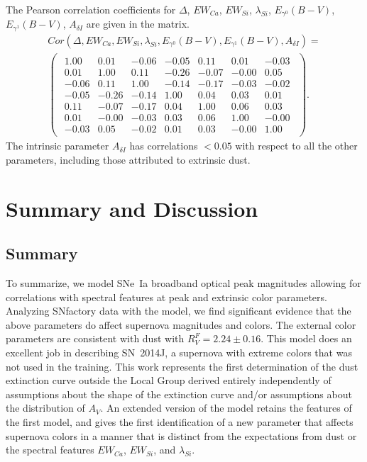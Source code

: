 \documentclass{aastex61}   	%
\begin{document}
The Pearson correlation coefficients for $\Delta$, $EW_{Ca}$, $EW_{Si}$, $\lambda_{Si}$, $E_{\gamma^0}(B-V)$, $E_{\gamma^1}(B-V)$,  $A_{\delta I}$ are given in the matrix.
\begin{multline}
Cor(\Delta, EW_{Ca}, EW_{Si}, \lambda_{Si}, E_{\gamma^0}(B-V), E_{\gamma^1}(B-V),  A_{\delta I}) =\\
\begin{pmatrix}
\begin{array}{rrrrrrr}
1.00 & 0.01 & -0.06 & -0.05 & 0.11 & 0.01 & -0.03 \\
0.01 & 1.00 & 0.11 & -0.26 & -0.07 & -0.00 & 0.05 \\
-0.06 & 0.11 & 1.00 & -0.14 & -0.17 & -0.03 & -0.02 \\
-0.05 & -0.26 & -0.14 & 1.00 & 0.04 & 0.03 & 0.01 \\
0.11 & -0.07 & -0.17 & 0.04 & 1.00 & 0.06 & 0.03 \\
0.01 & -0.00 & -0.03 & 0.03 & 0.06 & 1.00 & -0.00 \\
-0.03 & 0.05 & -0.02 & 0.01 & 0.03 & -0.00 & 1.00
\end{array}
\end{pmatrix}.
\end{multline}
The intrinsic parameter $A_{\delta I}$ has correlations $<0.05$ with respect to all the other parameters, including those attributed
to extrinsic dust.

\section{Summary and Discussion}
\label{discussion:sec}
\subsection{Summary}
To summarize, we model SNe~Ia broadband optical peak magnitudes allowing for correlations with spectral features at peak and
extrinsic color parameters.  Analyzing SNfactory data with the model, we find significant evidence that the above parameters do
affect supernova magnitudes and colors.  The external color parameters are consistent with \citet{1999PASP..111...63F} dust
with $R^F_V=2.24 \pm 0.16$.  This model  does an excellent job in
describing SN~2014J, a supernova with extreme colors that was not used in the training.  
This work represents the first determination of the dust extinction curve outside the Local Group
derived entirely independently of assumptions about the shape of the extinction curve and/or assumptions about the
distribution of $A_V$.  An extended version
of the model retains the features of the first model, and gives the first identification of  a new parameter that affects supernova
colors in a manner that is distinct from  the expectations from dust or the spectral features $EW_{Ca}$, $EW_{Si}$, and $\lambda_{Si}$.
\end{document}
